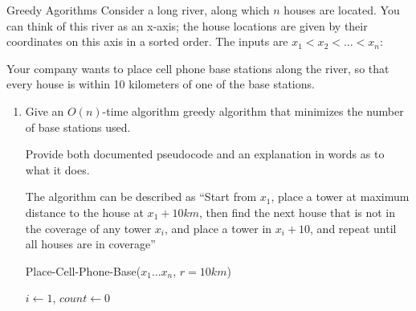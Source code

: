 \documentclass{article}
\numberwithin{table}{section}
\numberwithin{figure}{section}
\begin{document}
\newpage
\begin{section}{Greedy Agorithms}
Consider a long river, along which $n$ houses are located. You can think of this river as an x-axis; the house locations are given by their coordinates on this axis in a sorted order. The inputs are $x_1 < x_2 < \dots < x_n$: 

Your company wants to place cell phone base stations along the river, so that every house is within 10 kilometers of one of the base stations.

\begin{enumerate}
    \item  Give an $O(n)$-time algorithm greedy algorithm that minimizes the number of base stations used.
    
    Provide both documented pseudocode and an explanation in words as to what it does.
    
    \begin{tcolorbox}
        The algorithm can be described as ``Start from $x_1$, place a tower at maximum distance to the house at $x_1 + 10km$, then find the next house that is not in the coverage of any tower $x_i$, and place a tower in $x_i + 10$, and repeat until all houses are in coverage''
        
        \begin{minipage}{\linewidth}
            \begin{algorithm}[H]
                \caption{Place-Cell-Phone-Base($x_1 \dots x_n$, $r = 10km$)}
                \KwLet $i \gets 1$, $count \gets 0$\\
            \end{algorithm}
        \end{minipage}
    \end{tcolorbox}
    

\end{enumerate}
\end{section}
\end{document}
